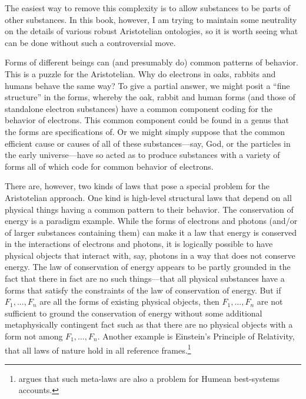 The easiest way to remove this complexity is to allow substances to be parts of other substances. In this book, however, 
I am trying to maintain some neutrality on the details of various robust Aristotelian ontologies, so it is worth seeing
what can be done without such a controversial move.

Forms of different beings can (and presumably do) common patterns of behavior.  This is a puzzle for the Aristotelian. 
Why do electrons in oaks, rabbits and humans behave the same way? To give a partial answer, we might posit a ``fine structure'' in the forms, whereby the oak, 
rabbit and human forms (and those of standalone electron substances) have a common component coding for the behavior of 
electrons. This common component could be found in a genus that the forms are specifications of. Or we might simply suppose
that the common efficient cause or causes of all of these substances---say, God, or the particles in the early universe---have
so acted as to produce substances with a variety of forms all of which code for common behavior of electrons. 

There are, however, two kinds of laws that pose a special problem for the Aristotelian approach. One kind is high-level
structural laws that depend on all physical things having a common pattern to their behavior. The conservation of energy
is a paradigm example. While the forms of electrons and photons (and/or of larger substances containing them) can make 
it a law that energy is conserved in the interactions of electrons and photons, it is logically possible to have 
physical objects that interact with, say, photons in a way that does not conserve energy. The law of conservation of 
energy appears to be partly grounded in the fact that there in fact are no such things---that all physical substances have a 
forms that satisfy the constraints of the law of conservation of energy. But if $F_1,...,F_n$ are all the forms
of existing physical objects, then $F_1,...,F_n$ are not sufficient to ground the conservation of energy without some
additional metaphysically contingent fact such as that there are no physical objects with a form not among $F_1,...,F_n$. 
Another example is Einstein's Principle of Relativity, that all laws of nature hold in all reference frames.\footnote{ argues that such meta-laws are also a problem for Humean best-systems accounts.}

